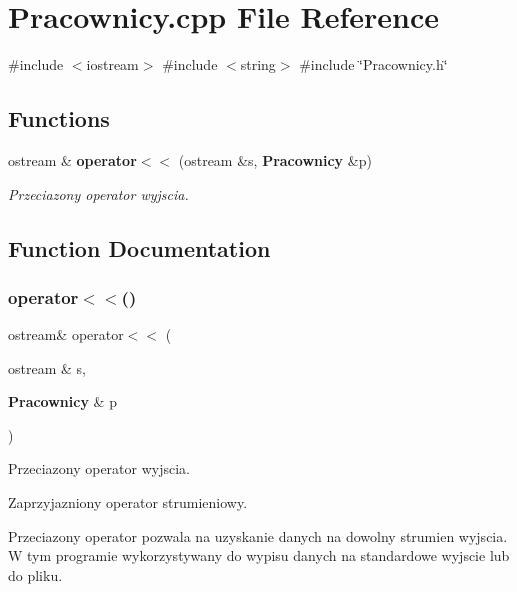\section{Pracownicy.\+cpp File Reference}
\label{_pracownicy_8cpp}
{\ttfamily \#include $<$iostream$>$}\newline
{\ttfamily \#include $<$string$>$}\newline
{\ttfamily \#include \char`\"{}Pracownicy.\+h\char`\"{}}\newline
\subsection*{Functions}
\begin{DoxyCompactItemize}
\item 
ostream \& \textbf{ operator$<$$<$} (ostream \&s, \textbf{ Pracownicy} \&p)
\begin{DoxyCompactList}\small\item\em Przeciazony operator wyjscia. \end{DoxyCompactList}\end{DoxyCompactItemize}


\subsection{Function Documentation}
\mbox{\label{_pracownicy_8cpp_a982680671c2057a272ee1ab713a2fc5f}} 
\subsubsection{operator$<$$<$()}
{\footnotesize\ttfamily ostream\& operator$<$$<$ (\begin{DoxyParamCaption}\item[{ostream \&}]{s,  }\item[{\textbf{ Pracownicy} \&}]{p }\end{DoxyParamCaption})}



Przeciazony operator wyjscia. 

Zaprzyjazniony operator strumieniowy.

Przeciazony operator pozwala na uzyskanie danych na dowolny strumien wyjscia. W tym programie wykorzystywany do wypisu danych na standardowe wyjscie lub do pliku. 